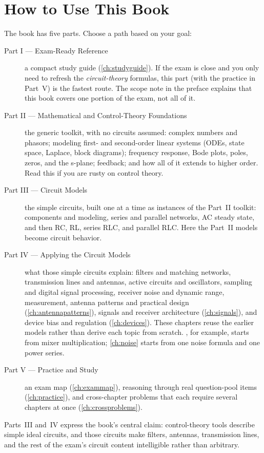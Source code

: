 \chapter*{How to Use This Book}
The book has five parts. Choose a path based on your goal:
\begin{description}
\item[Part I --- Exam-Ready Reference] a compact study guide
(\cref{ch:studyguide}). If the exam is close and you only need to refresh the
\emph{circuit-theory} formulas, this part (with the practice in Part~V) is the
fastest route. The scope note in the preface explains that this book covers one
portion of the exam, not all of it.
\item[Part II --- Mathematical and Control-Theory Foundations] the generic
toolkit, with no circuits assumed: complex numbers and phasors; modeling first- and
second-order linear systems (ODEs, state space, Laplace, block diagrams); frequency
response, Bode plots, poles, zeros, and the s-plane; feedback; and how all of it
extends to higher order. Read this if you are rusty on control theory.
\item[Part III --- Circuit Models] the simple circuits, built one at a time as
instances of the Part~II toolkit: components and modeling, series and parallel
networks, AC steady state, and then RC, RL, series RLC, and parallel RLC. Here the
Part~II models become circuit behavior.
\item[Part IV --- Applying the Circuit Models] what those simple circuits explain:
filters and matching networks, transmission lines and antennas, active circuits and
oscillators, sampling and digital signal processing, receiver noise and dynamic
range, measurement, antenna patterns and practical design (\cref{ch:antennapatterns}),
signals and receiver architecture (\cref{ch:signals}), and device bias and regulation
(\cref{ch:devices}). These chapters reuse the earlier models rather than derive each
topic from scratch. , for example, starts from mixer multiplication;
\cref{ch:noise} starts from one noise formula and one power series.
\item[Part V --- Practice and Study] an exam map (\cref{ch:exammap}), reasoning
through real question-pool items (\cref{ch:practice}), and cross-chapter problems
that each require several chapters at once (\cref{ch:crossproblems}).
\end{description}

Parts~III and~IV express the book's central claim: control-theory tools describe
simple ideal circuits, and those circuits make filters, antennas, transmission
lines, and the rest of the exam's circuit content intelligible rather than arbitrary.

